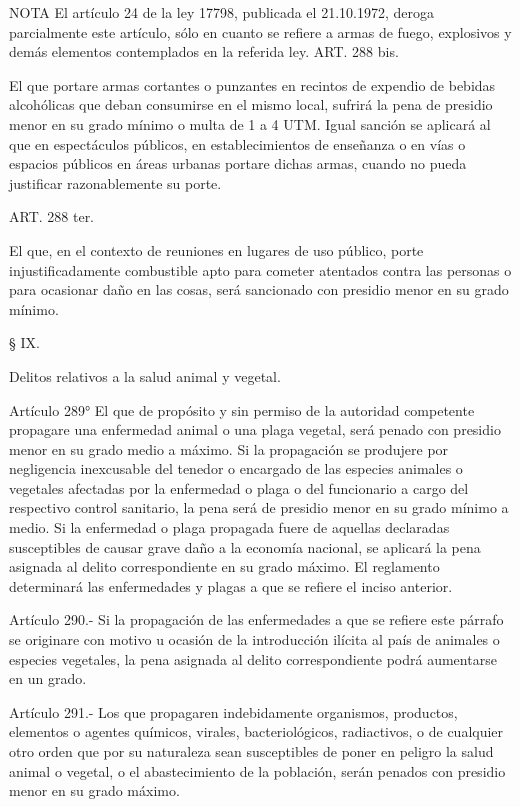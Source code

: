 NOTA
      El artículo 24 de la ley 17798, publicada el 21.10.1972, deroga parcialmente este artículo, sólo en cuanto se refiere a armas de fuego, explosivos y demás elementos contemplados en la referida ley.
    ART. 288 bis.

    El que portare armas cortantes o punzantes en recintos de expendio de bebidas alcohólicas que deban consumirse en el mismo local, sufrirá la pena de presidio menor en su grado mínimo o multa de 1 a 4 UTM.
    Igual sanción se aplicará al que en espectáculos públicos, en establecimientos de enseñanza o en vías o espacios públicos en áreas urbanas portare dichas armas, cuando no pueda justificar razonablemente su porte.

    ART. 288 ter.

    El que, en el contexto de reuniones en lugares de uso público, porte injustificadamente combustible apto para cometer atentados contra las personas o para ocasionar daño en las cosas, será sancionado con presidio menor en su grado mínimo.

    § IX.

    Delitos relativos a la salud animal y vegetal.


    Artículo 289° El que de propósito y sin permiso de la autoridad competente propagare una enfermedad animal o una plaga vegetal, será penado con presidio menor en su grado medio a máximo.
    Si la propagación se produjere por negligencia inexcusable del tenedor o encargado de las especies animales o vegetales afectadas por la enfermedad o plaga o del funcionario a cargo del respectivo control sanitario, la pena será de presidio menor en su grado mínimo a medio.
    Si la enfermedad o plaga propagada fuere de aquellas declaradas susceptibles de causar grave daño a la economía nacional, se aplicará la pena asignada al delito correspondiente en su grado máximo.
    El reglamento determinará las enfermedades y plagas a que se refiere el inciso anterior.




    Artículo 290.- Si la propagación de las enfermedades a que se refiere este párrafo se originare con motivo u ocasión de la introducción ilícita al país de animales o especies vegetales, la pena asignada al delito correspondiente podrá aumentarse en un grado.





    Artículo 291.- Los que propagaren indebidamente organismos, productos, elementos o agentes químicos, virales, bacteriológicos, radiactivos, o de cualquier otro orden que por su naturaleza sean susceptibles de poner en peligro la salud animal o vegetal, o el abastecimiento de la población, serán penados con presidio menor en su grado máximo.


